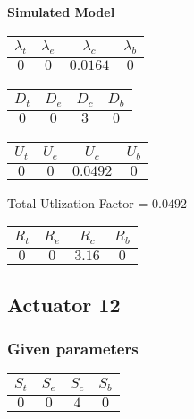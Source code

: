 \documentclass{article}
\begin{document}
\begin{minipage}{0.5\textwidth}
\centering	\textbf{Simulated Model}
\begin{table}[H]
\centering
\begin{tabular}{@{}cccc@{}}
\toprule
$\lambda_t$ & $\lambda_e$ & $\lambda_c$ & $\lambda_b$\\
\midrule
$0$ & $0$ & $0.0164$ & $0$\\
\bottomrule
\end{tabular}
\end{table}
\begin{table}[H]
\centering
\begin{tabular}{@{}cccc@{}}
\toprule
$D_t$ & $D_e$ & $D_c$ & $D_b$\\
\midrule
$0$ & $0$ & $3$ & $0$\\
\bottomrule
\end{tabular}
\end{table}\begin{table}[H]
\centering
\begin{tabular}{@{}cccc@{}}
\toprule
$U_t$ & $U_e$ & $U_c$ & $U_b$\\
\midrule
$0$ & $0$ & $0.0492$ & $0$\\
\bottomrule
\end{tabular}
\end{table}
\centering Total Utlization Factor = $0.0492$
\begin{table}[H]
\centering
\begin{tabular}{@{}cccc@{}}
\toprule
$R_t$ & $R_e$ & $R_c$ & $R_b$\\
\midrule
$0$ & $0$ & $3.16$ & $0$\\
\bottomrule
\end{tabular}
\end{table}
\end{minipage}\subsection{Actuator 12}
\subsubsection{Given parameters}
\begin{table}[H]
\centering
\begin{tabular}{@{}cccc@{}}
\toprule
$S_t$ & $S_e$ & $S_c$ & $S_b$\\
\midrule
$0$ & $0$ & $4$ & $0$\\
\bottomrule
\end{tabular}
\end{table}
\end{document}
